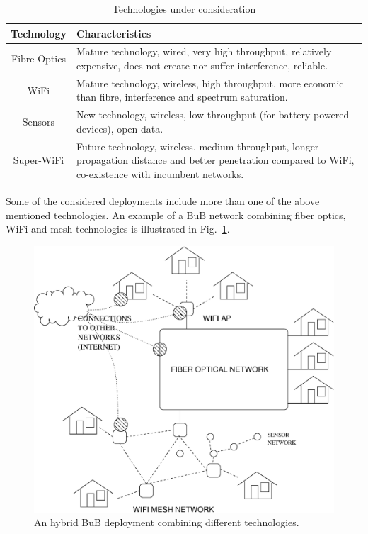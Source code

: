 \documentclass[conference]{IEEEtran}
\begin{document}
\begin{table}[!t]
\renewcommand{\arraystretch}{1.3}
\caption{Technologies under consideration}
\label{tab:technologies}
\centering
\begin{tabular}{|c|p{5cm}|}
\hline
Technology & Characteristics \\
\hline
Fibre Optics & Mature technology, wired, very high throughput, relatively expensive, does not create nor suffer interference, reliable. \\
WiFi & Mature technology, wireless, high throughput, more economic than fibre, interference and spectrum saturation. \\
Sensors & New technology, wireless, low throughput (for battery-powered devices), open data. \\
Super-WiFi & Future technology, wireless, medium throughput, longer propagation distance and better penetration compared to WiFi, co-existence with incumbent networks.\\
\hline
\end{tabular}
\end{table}

Some of the considered deployments include more than one of the above mentioned technologies.
An example of a BuB network combining fiber optics, WiFi and mesh technologies is illustrated in Fig.~\ref{fig:hybrid}.
\begin{figure}[!t]
\centering
\includegraphics[width=\linewidth]{hybrid}
\caption{An hybrid BuB deployment combining different technologies.}
\label{fig:hybrid}
\end{figure}
\end{document}

